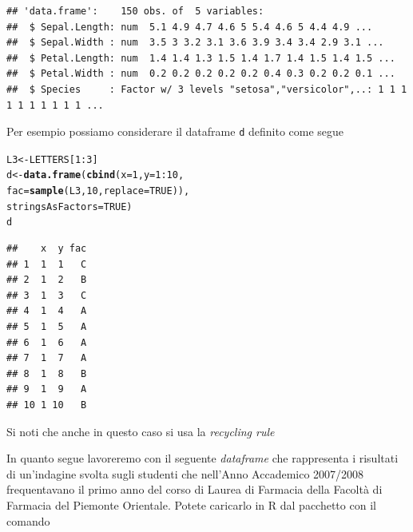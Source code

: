 \documentclass[onecolumn,12pt]{book}\usepackage[]{graphicx}\usepackage[]{color}
\makeatletter
\newcommand{\hlnum}[1]{\textcolor[rgb]{0.686,0.059,0.569}{#1}}%
\newcommand{\hlopt}[1]{\textcolor[rgb]{0,0,0}{#1}}%
\newcommand{\hlstd}[1]{\textcolor[rgb]{0.345,0.345,0.345}{#1}}%
\newcommand{\hlkwb}[1]{\textcolor[rgb]{0.69,0.353,0.396}{#1}}%
\newcommand{\hlkwc}[1]{\textcolor[rgb]{0.333,0.667,0.333}{#1}}%
\newcommand{\hlkwd}[1]{\textcolor[rgb]{0.737,0.353,0.396}{\textbf{#1}}}%
\newenvironment{kframe}{%
 \def\at@end@of@kframe{}%
 \ifinner\ifhmode%
  \def\at@end@of@kframe{\end{minipage}}%
  \begin{minipage}{\columnwidth}%
 \fi\fi%
 \def\FrameCommand##1{\hskip\@totalleftmargin \hskip-\fboxsep
 \colorbox{shadecolor}{##1}\hskip-\fboxsep
     \hskip-\linewidth \hskip-\@totalleftmargin \hskip\columnwidth}%
 \MakeFramed {\advance\hsize-\width
   \@totalleftmargin\z@ \linewidth\hsize
   \@setminipage}}%
 {\par\unskip\endMakeFramed%
 \at@end@of@kframe}
\newenvironment{knitrout}{}{} %
\makeatother
\begin{document}
\small
\begin{knitrout}
\color{fgcolor}\begin{kframe}
\begin{verbatim}
## 'data.frame':	150 obs. of  5 variables:
##  $ Sepal.Length: num  5.1 4.9 4.7 4.6 5 5.4 4.6 5 4.4 4.9 ...
##  $ Sepal.Width : num  3.5 3 3.2 3.1 3.6 3.9 3.4 3.4 2.9 3.1 ...
##  $ Petal.Length: num  1.4 1.4 1.3 1.5 1.4 1.7 1.4 1.5 1.4 1.5 ...
##  $ Petal.Width : num  0.2 0.2 0.2 0.2 0.2 0.4 0.3 0.2 0.2 0.1 ...
##  $ Species     : Factor w/ 3 levels "setosa","versicolor",..: 1 1 1 1 1 1 1 1 1 1 ...
\end{verbatim}
\end{kframe}
\end{knitrout}
\normalsize
Per esempio possiamo considerare il dataframe \texttt{d} definito come segue 
\begin{knitrout}
\color{fgcolor}\begin{kframe}
\begin{alltt}
\hlstd{L3} \hlkwb{<-} \hlstd{LETTERS[}\hlnum{1}\hlopt{:}\hlnum{3}\hlstd{]}
\hlstd{d} \hlkwb{<-} \hlkwd{data.frame}\hlstd{(}\hlkwd{cbind}\hlstd{(}\hlkwc{x}\hlstd{=}\hlnum{1}\hlstd{,} \hlkwc{y}\hlstd{=}\hlnum{1}\hlopt{:}\hlnum{10}\hlstd{,}
\hlkwc{fac}\hlstd{=}\hlkwd{sample}\hlstd{(L3,} \hlnum{10}\hlstd{,} \hlkwc{replace}\hlstd{=}\hlnum{TRUE}\hlstd{)),}
\hlkwc{stringsAsFactors}\hlstd{=}\hlnum{TRUE}\hlstd{)}
\hlstd{d}
\end{alltt}
\begin{verbatim}
##    x  y fac
## 1  1  1   C
## 2  1  2   B
## 3  1  3   C
## 4  1  4   A
## 5  1  5   A
## 6  1  6   A
## 7  1  7   A
## 8  1  8   B
## 9  1  9   A
## 10 1 10   B
\end{verbatim}
\end{kframe}
\end{knitrout}
Si noti che anche in questo caso si usa la \emph{recycling rule}

In quanto segue lavoreremo con il seguente \emph{dataframe} che rappresenta i risultati di un'indagine svolta sugli studenti che nell'Anno Accademico 2007/2008 frequentavano il primo anno del corso di Laurea di Farmacia della Facolt\`a di Farmacia del Piemonte Orientale. Potete caricarlo  in {\textsf R} dal pacchetto con il comando
\end{document}

